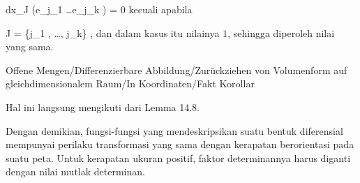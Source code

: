{\mavergleichskette
{\vergleichskette
{ dx_J (e_{j_1 } \wedge \ldots \wedge e_{j_k })
}
{ = }{ 0
}
{  }{
}
{    }{
}
{   }{
}
}
{}{}{}
kecuali apabila

\mavergleichskette
{\vergleichskette
{ J
}
{ = }{ \{j_1 , \ldots , j_k\}
}
{  }{
}
{    }{
}
{   }{
}
}
{}{}{,}
dan dalam kasus itu nilainya $1$, sehingga diperoleh nilai yang sama.

}



{Offene Mengen/Differenzierbare Abbildung/Zurückziehen von Volumenform auf gleichdimensionalem Raum/In Koordinaten/Fakt}
{Korollar}
{}
{

\faktzusatz {}
\faktzusatz {}

}
{

Hal ini langsung mengikuti dari
Lemma 14.8.

}
Dengan demikian, fungsi-fungsi yang mendeskripsikan suatu bentuk diferensial mempunyai perilaku transformasi yang sama dengan kerapatan berorientasi pada suatu peta. Untuk kerapatan ukuran positif, faktor determinannya harus diganti dengan nilai mutlak determinan.



